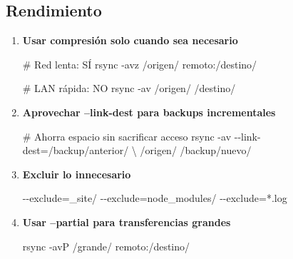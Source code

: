 \documentclass[
  doc,
  floatsintext,
  longtable,
  a4paper,
  nolmodern,
  notxfonts,
  notimes,
  12pt,
  colorlinks=true,linkcolor=blue,citecolor=blue,urlcolor=blue]{apa7}
\newenvironment{Shaded}{\begin{snugshade}}{\end{snugshade}}
\newcommand{\AttributeTok}[1]{\textcolor[rgb]{0.40,0.45,0.13}{#1}}
\newcommand{\CommentTok}[1]{\textcolor[rgb]{0.37,0.37,0.37}{#1}}
\newcommand{\DataTypeTok}[1]{\textcolor[rgb]{0.68,0.00,0.00}{#1}}
\newcommand{\ExtensionTok}[1]{\textcolor[rgb]{0.00,0.23,0.31}{#1}}
\newcommand{\FunctionTok}[1]{\textcolor[rgb]{0.28,0.35,0.67}{#1}}
\newcommand{\NormalTok}[1]{\textcolor[rgb]{0.00,0.23,0.31}{#1}}
\newcommand{\OperatorTok}[1]{\textcolor[rgb]{0.37,0.37,0.37}{#1}}
\newcommand{\StringTok}[1]{\textcolor[rgb]{0.13,0.47,0.30}{#1}}
\begin{document}
\subsection{Rendimiento}\label{rendimiento}

\begin{enumerate}
\def\labelenumi{\arabic{enumi}.}
\item
  \textbf{Usar compresión solo cuando sea necesario}

\begin{Shaded}
\begin{Highlighting}[]
\CommentTok{\# Red lenta: SÍ}
\FunctionTok{rsync} \AttributeTok{{-}avz}\NormalTok{ /origen/ remoto:/destino/}

\CommentTok{\# LAN rápida: NO}
\FunctionTok{rsync} \AttributeTok{{-}av}\NormalTok{ /origen/ /destino/}
\end{Highlighting}
\end{Shaded}
\item
  \textbf{Aprovechar --link-dest para backups incrementales}

\begin{Shaded}
\begin{Highlighting}[]
\CommentTok{\# Ahorra espacio sin sacrificar acceso}
\FunctionTok{rsync} \AttributeTok{{-}av} \AttributeTok{{-}{-}link{-}dest}\OperatorTok{=}\NormalTok{/backup/anterior/ }\DataTypeTok{\textbackslash{}}
\NormalTok{    /origen/ /backup/nuevo/}
\end{Highlighting}
\end{Shaded}
\item
  \textbf{Excluir lo innecesario}

\begin{Shaded}
\begin{Highlighting}[]
\ExtensionTok{{-}{-}exclude=}\StringTok{\textquotesingle{}\_site/\textquotesingle{}}
\ExtensionTok{{-}{-}exclude=}\StringTok{\textquotesingle{}node\_modules/\textquotesingle{}}
\ExtensionTok{{-}{-}exclude=}\StringTok{\textquotesingle{}*.log\textquotesingle{}}
\end{Highlighting}
\end{Shaded}
\item
  \textbf{Usar --partial para transferencias grandes}

\begin{Shaded}
\begin{Highlighting}[]
\FunctionTok{rsync} \AttributeTok{{-}avP}\NormalTok{ /grande/ remoto:/destino/}
\end{Highlighting}
\end{Shaded}
\end{enumerate}
\end{document}
